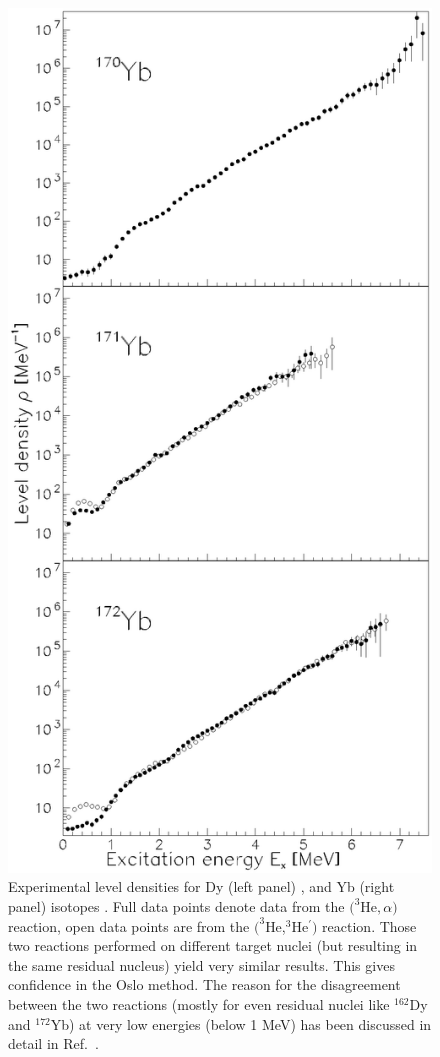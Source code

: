 \documentclass[sort&compress,final,numberedheadings]{aipproc}
\begin{document}
\begin{figure}
\includegraphics[totalheight=10cm,angle=0,bb=107 31 481 783,clip]{fig1b.ps}
\caption{Experimental level densities for Dy (left panel) \protect\cite{GB03}, 
and Yb (right panel) isotopes \protect\cite{AS04}. Full data points denote data
from the $(^3$He$,\alpha)$ reaction, open data points are from the 
$(^3$He,$^3$He$^\prime)$ reaction. Those two reactions performed on different 
target nuclei (but resulting in the same residual nucleus) yield very similar 
results. This gives confidence in the Oslo method. The reason for the 
disagreement between the two reactions (mostly for even residual nuclei like 
$^{162}$Dy and $^{172}$Yb) at very low energies (below 1 MeV) has been 
discussed in detail in Ref.\ \protect\cite{SG00}.}
\label{fig:dyyb}
\end{figure}
\end{document}
